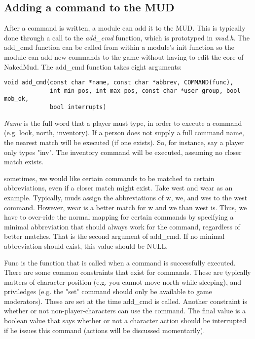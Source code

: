 \documentclass[fignum,doc]{article}
\begin{document}
\begin{doublespace}
\subsection{Adding a command to the MUD}
After a command is written, a module can add it to the MUD. This is typically done through a call to the {\it add\_cmd} function, which is prototyped in {\it mud.h}. The add\_cmd function can be called from within a module's init function so the module can add new commands to the game without having to edit the core of NakedMud. The add\_cmd function takes eight arguments:
\begin{verbatim}
void add_cmd(const char *name, const char *abbrev, COMMAND(func),
             int min_pos, int max_pos, const char *user_group, bool mob_ok,
             bool interrupts)
\end{verbatim}
{\it Name} is the full word that a player must type, in order to execute a command (e.g. look, north, inventory). If a person does not supply a full command name, the nearest match will be executed (if one exists). So, for instance, say a player only types "inv". The inventory command will be executed, assuming no closer match exists. 

sometimes, we would like certain commands to be matched to certain abbreviations, even if a closer match might exist. Take west and wear as an example. Typically, muds assign the abbreviations of w, we, and wes to the west command. However, wear is a better match for w and we than west is. Thus, we have to over-ride the normal mapping for certain commands by specifying a minimal abbreviation that should always work for the command, regardless of better matches. That is the second argument of add\_cmd. If no minimal abbreviation should exist, this value should be NULL.

Func is the function that is called when a command is successfully executed. There are some common constraints that exist for commands. These are typically matters of character position (e.g. you cannot move north while sleeping), and priviledges (e.g. the "set" command should only be available to game moderators). These are set at the time add\_cmd is called. Another constraint is whether or not non-player-characters can use the command. The final value is a boolean value that says whether or not a character action should be interrupted if he issues this command (actions will be discussed momentarily).




\end{doublespace}
\end{document}
